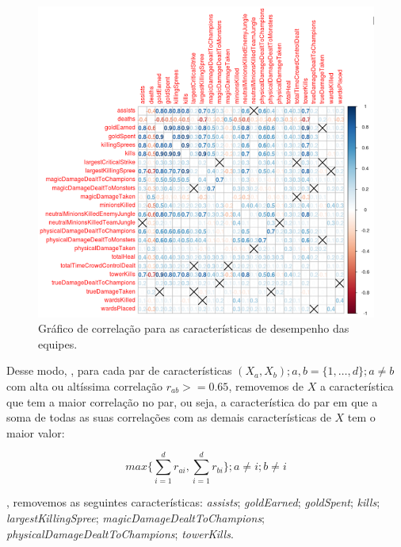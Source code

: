 \begin{figure}
  \centering
  \includegraphics[width=1.0\textwidth]{correlations}%
  \caption{Gráfico de correlação para as características de desempenho das equipes. }
  \label{fig:correlations}
\end{figure}

Desse modo, , para cada par de características $(X_a, X_b); a, b=\{1, \ldots, d\};a \neq b$ com alta ou altíssima correlação $r_{ab} >= 0.65$, removemos de $X$ a característica que tem a maior correlação no par, ou seja, a característica do par em que a soma de todas as suas correlações com as demais características de $X$ tem o maior valor:

\begin{displaymath}
  max \big\{ \sum_{i=1}^{d} r_{ai} ,  \sum_{i=1}^{d} r_{bi} \big\}; a \neq i; b \neq i
\end{displaymath}

, removemos as seguintes características: \textit{assists}; \textit{goldEarned}; \textit{goldSpent}; \textit{kills}; \textit{largestKillingSpree}; \textit{magicDamageDealtToChampions}; \textit{physicalDamageDealtToChampions}; \textit{towerKills}.

